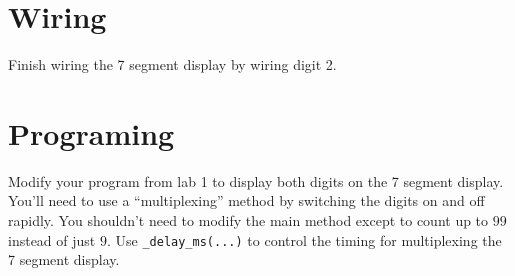 \documentclass[main.tex]{subfile}
\begin{document}
\section{Wiring} 
\label{sec:wiring}

Finish wiring the 7 segment display by wiring digit 2.


\section{Programing} 
\label{sec:programing}

Modify your program from lab 1 to display both digits on the 7 segment display.
You'll need to use a ``multiplexing'' method by switching the digits on and off
rapidly. You shouldn't need to modify the main method except to count up to $99$
instead of just $9$. Use \texttt{\_delay\_ms(...)} to control the timing for
multiplexing the 7 segment display.

\end{document}
